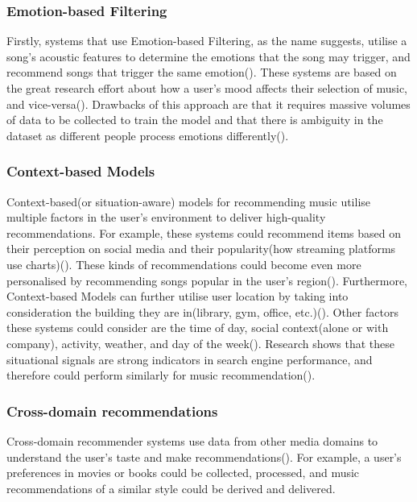\documentclass{l4proj}
\begin{document}
\subsubsection{Emotion-based Filtering}Firstly, systems that use Emotion-based Filtering, as the name suggests, utilise a song's acoustic features to determine the emotions that the song may trigger, and recommend songs that trigger the same emotion(\cite{Paul_Kundu_2019}). These systems are based on the great research effort about how a user's mood affects their selection of music, and vice-versa(\cite{Paul_Kundu_2019}). Drawbacks of this approach are that it requires massive volumes of data to be collected to train the model and that there is ambiguity in the dataset as different people process emotions differently(\cite{Paul_Kundu_2019}).
\subsubsection{Context-based Models} Context-based(or situation-aware) models for recommending music utilise multiple factors in the user's environment to deliver high-quality recommendations. For example, these systems could recommend items based on their perception on social media and their popularity(how streaming platforms use charts)(\cite{Paul_Kundu_2019}). These kinds of recommendations could become even more personalised by recommending songs popular in the user's region(\cite{Paul_Kundu_2019}). Furthermore, Context-based Models can further utilise user location by taking into consideration the building they are in(library, gym, office, etc.)(\cite{Schedl_Zamani_Chen_Deldjoo_Elahi_2018}). Other factors these systems could consider are the time of day, social context(alone or with company), activity, weather, and day of the week(\cite{Schedl_Zamani_Chen_Deldjoo_Elahi_2018}). Research shows that these situational signals are strong indicators in search engine performance, and therefore could perform similarly for music recommendation(\cite{Schedl_Zamani_Chen_Deldjoo_Elahi_2018}).
\subsubsection{Cross-domain recommendations} Cross-domain recommender systems use data from other media domains to understand the user's taste and make recommendations(\cite{Schedl_Zamani_Chen_Deldjoo_Elahi_2018}). For example, a user's preferences in movies or books could be collected, processed, and music recommendations of a similar style could be derived and delivered.
\end{document}
